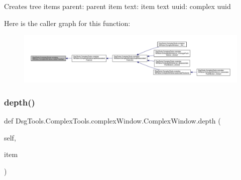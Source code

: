 \begin{DoxyVerb}Creates tree items
parent: parent item
text: item text
uuid: complex uuid
\end{DoxyVerb}
 Here is the caller graph for this function\+:
\nopagebreak
\begin{figure}[H]
\begin{center}
\leavevmode
\includegraphics[width=350pt]{class_dsg_tools_1_1_complex_tools_1_1complex_window_1_1_complex_window_a3404a1ab1ce3eeb54abf660981d37ba7_icgraph}
\end{center}
\end{figure}
\mbox{\label{class_dsg_tools_1_1_complex_tools_1_1complex_window_1_1_complex_window_ab97194d04bc78eb3536f4c5c8325cbe1}} 
\subsubsection{\texorpdfstring{depth()}{depth()}}
{\footnotesize\ttfamily def Dsg\+Tools.\+Complex\+Tools.\+complex\+Window.\+Complex\+Window.\+depth (\begin{DoxyParamCaption}\item[{}]{self,  }\item[{}]{item }\end{DoxyParamCaption})}

